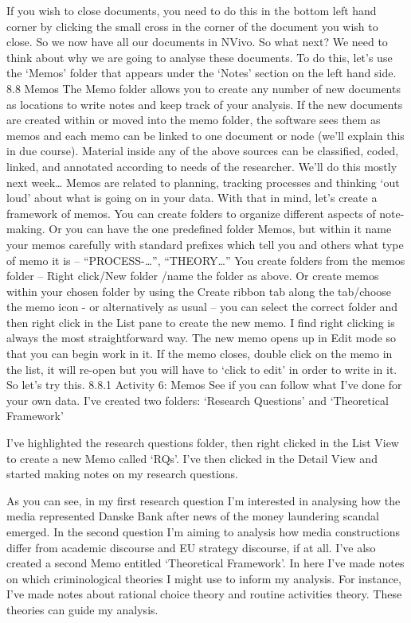 \documentclass[
]{book}
\begin{document}
If you wish to close documents, you need to do this in the bottom left hand corner by clicking the small cross in the corner of the document you wish to close.
So we now have all our documents in NVivo. So what next? We need to think about why we are going to analyse these documents. To do this, let's use the `Memos' folder that appears under the `Notes' section on the left hand side.
8.8 Memos
The Memo folder allows you to create any number of new documents as locations to write notes and keep track of your analysis. If the new documents are created within or moved into the memo folder, the software sees them as memos and each memo can be linked to one document or node (we'll explain this in due course).
Material inside any of the above sources can be classified, coded, linked, and annotated according to needs of the researcher. We'll do this mostly next week\ldots{}
Memos are related to planning, tracking processes and thinking `out loud' about what is going on in your data. With that in mind, let's create a framework of memos. You can create folders to organize different aspects of note-making. Or you can have the one predefined folder Memos, but within it name your memos carefully with standard prefixes which tell you and others what type of memo it is -- ``PROCESS-\ldots{}'', ``THEORY\ldots{}''
You create folders from the memos folder -- Right click/New folder /name the folder as above. Or create memos within your chosen folder by using the Create ribbon tab along the tab/choose the memo icon - or alternatively as usual -- you can select the correct folder and then right click in the List pane to create the new memo. I find right clicking is always the most straightforward way. The new memo opens up in Edit mode so that you can begin work in it. If the memo closes, double click on the memo in the list, it will re-open but you will have to `click to edit' in order to write in it. So let's try this.
8.8.1 Activity 6: Memos
See if you can follow what I've done for your own data.
I've created two folders: `Research Questions' and `Theoretical Framework'

I've highlighted the research questions folder, then right clicked in the List View to create a new Memo called `RQs'. I've then clicked in the Detail View and started making notes on my research questions.

As you can see, in my first research question I'm interested in analysing how the media represented Danske Bank after news of the money laundering scandal emerged.
In the second question I'm aiming to analysis how media constructions differ from academic discourse and EU strategy discourse, if at all.
I've also created a second Memo entitled `Theoretical Framework'. In here I've made notes on which criminological theories I might use to inform my analysis. For instance, I've made notes about rational choice theory and routine activities theory. These theories can guide my analysis.
\end{document}
